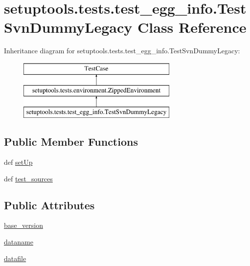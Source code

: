 \hypertarget{classsetuptools_1_1tests_1_1test__egg__info_1_1TestSvnDummyLegacy}{}\section{setuptools.\+tests.\+test\+\_\+egg\+\_\+info.\+Test\+Svn\+Dummy\+Legacy Class Reference}
\label{classsetuptools_1_1tests_1_1test__egg__info_1_1TestSvnDummyLegacy}
Inheritance diagram for setuptools.\+tests.\+test\+\_\+egg\+\_\+info.\+Test\+Svn\+Dummy\+Legacy\+:\begin{figure}[H]
\begin{center}
\leavevmode
\includegraphics[height=3.000000cm]{classsetuptools_1_1tests_1_1test__egg__info_1_1TestSvnDummyLegacy}
\end{center}
\end{figure}
\subsection*{Public Member Functions}
\begin{DoxyCompactItemize}
\item 
def \hyperlink{classsetuptools_1_1tests_1_1test__egg__info_1_1TestSvnDummyLegacy_a1256bc88975b9fd940e0300926339d8f}{set\+Up}
\item 
def \hyperlink{classsetuptools_1_1tests_1_1test__egg__info_1_1TestSvnDummyLegacy_aaf5b4218edbc7115ca04a9270de4a080}{test\+\_\+sources}
\end{DoxyCompactItemize}
\subsection*{Public Attributes}
\begin{DoxyCompactItemize}
\item 
\hyperlink{classsetuptools_1_1tests_1_1test__egg__info_1_1TestSvnDummyLegacy_aa5b4ffbb0d5156317874ca3340c61ed3}{base\+\_\+version}
\item 
\hyperlink{classsetuptools_1_1tests_1_1test__egg__info_1_1TestSvnDummyLegacy_a0531c53d8cf53ab2f0f0ed6a05f89341}{dataname}
\item 
\hyperlink{classsetuptools_1_1tests_1_1test__egg__info_1_1TestSvnDummyLegacy_a822db7b44dffb842e034c9f60be5ba53}{datafile}
\end{DoxyCompactItemize}
